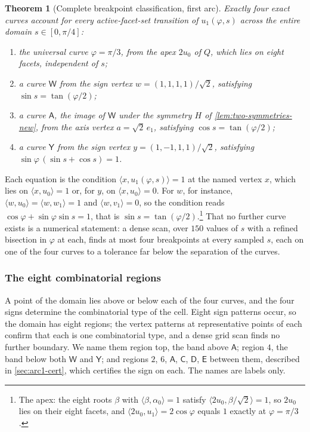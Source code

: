 \documentclass[11pt,reqno]{amsart}
\renewcommand{\_}{\origunderscore\allowbreak}
\numberwithin{equation}{section}
\theoremstyle{plain}
\newtheorem{thm}{Theorem}[section]
\theoremstyle{definition}
\theoremstyle{remark}
\newcommand{\tilt}{\varphi}                  %
\newcommand{\arcp}{s}                        %
\begin{document}
\begin{thm}[Complete breakpoint classification, first arc]\label{thm:arc1-breakpoints-new}
Exactly four exact curves account for every active-facet-set transition
of $u_1(\tilt,\arcp)$ across the entire domain $\arcp\in[0,\pi/4]$:
\begin{enumerate}[leftmargin=2em]
\item the \emph{universal curve} $\tilt=\pi/3$, from the apex $2u_0$
of $Q$, which lies on eight facets, independent of $\arcp$;
\item a curve $\mathsf W$ from the sign vertex
$w=(1,1,1,1)/\sqrt2$, satisfying $\sin\arcp=\tan(\tilt/2)$;
\item a curve $\mathsf A$, the image of $\mathsf W$ under the symmetry
$H$ of \cref{lem:two-symmetries-new}, from the axis vertex
$a=\sqrt2\,e_1$, satisfying $\cos\arcp=\tan(\tilt/2)$;
\item a curve $\mathsf Y$ from the sign vertex
$y=(1,-1,1,1)/\sqrt2$, satisfying
$\sin\tilt\,(\sin\arcp+\cos\arcp)=1$.
\end{enumerate}
\end{thm}

Each equation is the condition $\langle x,u_1(\tilt,\arcp)\rangle=1$ at
the named vertex $x$, which lies on $\langle x,u_0\rangle=1$ or, for
$y$, on $\langle x,u_0\rangle=0$. For $w$, for instance,
$\langle w,u_0\rangle=\langle w,w_1\rangle=1$ and $\langle w,v_1\rangle=0$,
so the condition reads $\cos\tilt+\sin\tilt\sin\arcp=1$, that is
$\sin\arcp=\tan(\tilt/2)$.\footnote{The apex: the eight roots $\beta$ with
$\langle\beta,\alpha_0\rangle=1$ satisfy $\langle 2u_0,\beta/\sqrt2\rangle=1$,
so $2u_0$ lies on their eight facets, and $\langle 2u_0,u_1\rangle=2\cos\tilt$
equals $1$ exactly at $\tilt=\pi/3$.} That no further curve exists is a
numerical statement: a dense scan, over $150$ values of $\arcp$ with a
refined bisection in $\tilt$ at each, finds at most four breakpoints at
every sampled $\arcp$, each on one of the four curves to a tolerance far
below the separation of the curves.

\subsubsection{The eight combinatorial regions}

A point of the domain lies above or below each of the four curves, and
the four signs determine the combinatorial type of the cell. Eight sign
patterns occur, so the domain has eight regions; the vertex patterns at
representative points of each confirm that each is one combinatorial
type, and a dense grid scan finds no further boundary. We name them
region top, the band above $\mathsf A$; region $4$, the band below both
$\mathsf W$ and $\mathsf Y$; and regions $2$, $6$, $\mathsf A$,
$\mathsf C$, $\mathsf D$, $\mathsf E$ between them, described in
\cref{sec:arc1-cert}, which certifies the sign on each. The names are
labels only.
\end{document}
